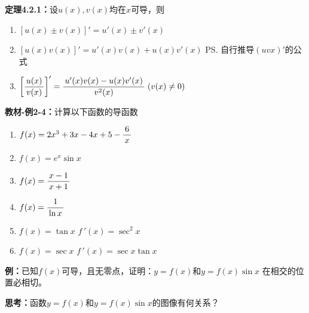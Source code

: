 {\bf 定理4.2.1：}设$u(x),v(x)$均在$x$可导，则
\begin{enumerate}[(1)]
  \setlength{\itemindent}{1cm}
  \item $[u(x)\pm v(x)]'=u'(x)\pm v'(x)$ 
  \item $[u(x)v(x)]' =u'(x)v(x)+u(x)v'(x)$ \ps{自行推导$(uvx)'$的公式}
  \item $\left[\displaystyle\frac{\,{u(x)}\,}{\,{v(x)}\,}\right]'
  =\displaystyle\frac{\,{u'(x)v(x)-u(x)v'(x)}\,}{\,{v^2(x)}\,}\;(v(x)\ne 0)$
\end{enumerate}

{\bf 教材-例2-4：}计算以下函数的导函数
\begin{enumerate}[(1)]
  \setlength{\itemindent}{1cm}
  \item $f(x)=2x^3+3x-4x+5-\displaystyle\frac{\,{6}\,}{\,{x}\,}$ 
  \item $f(x)=e^x\sin x$ 
  \item $f(x)=\displaystyle\frac{\,{x-1}\,}{\,{x+1}\,}$ 
  \item $f(x)=\displaystyle\frac{\,{1}\,}{\,{\ln x}\,}$ 
  \item $f(x)=\tan x$ \hfill $f\,'(x)=\sec^2 x$ 
  \item $f(x)=\sec x$ \hfill $f\,'(x)=\sec x\tan x$
\end{enumerate}

{\bf 例：}已知$f(x)$可导，且无零点，证明：$y=f(x)$和$y=f(x)\sin x$
在相交的位置必相切。

{\bf 思考：}函数$y=f(x)$和$y=f(x)\sin x$的图像有何关系？

